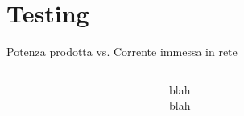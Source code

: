 \documentclass{beamer}
\begin{document}
\section{Testing}
\begin{frame}{Potenza prodotta vs. Corrente immessa in rete}
  \begin{columns}
    \column{2.5in}
    \begin{figure}[!h]
      \begin{center}
      \end{center}
    \end{figure}
    \begin{figure}[!h]
      \begin{center}
      \end{center}
    \end{figure}
    \column{1.5in}
    blah \\
    blah
  \end{columns}
\end{frame}
%
\end{document}
